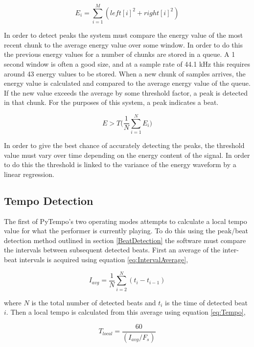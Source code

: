 \documentclass[hidelinks,12pt]{article}
\begin{document}
\begin{equation} \label{eq:EnergySum}
	E_i = \sum_{i=1}^{M}(left[i]^2 + right[i]^2)
\end{equation}

In order to detect peaks the system must compare the energy value of the most recent chunk to the average energy value over some window. In order to do this the previous energy values for a number of chunks are stored in a queue. A 1 second window is often a good size, and at a sample rate of 44.1 kHz this requires around 43 energy values to be stored. When a new chunk of samples arrives, the energy value is calculated and compared to the average energy value of the queue. If the new value exceeds the average by some threshold factor, a peak is detected in that chunk. For the purposes of this system, a peak indicates a beat.

\begin{equation}
	E > T\Bigg(\frac{1}{N}\sum_{i=1}^{N}E_i\Bigg)
\end{equation}

In order to give the best chance of accurately detecting the peaks, the threshold value must vary over time depending on the energy content of the signal. In order to do this the threshold is linked to the variance of the energy waveform by a linear regression.

\subsection{Tempo Detection}
The first of PyTempo's two operating modes attempts to calculate a local tempo value for what the performer is currently playing. To do this using the peak/beat detection method outlined in section  \ref{BeatDetection} the software must compare the intervals between subsequent detected beats. First an average of the inter-beat intervals is acquired using equation \ref{eq:IntervalAverage},

\begin{equation} \label{eq:IntervalAverage}
	I_{avg} = \frac{1}{N}\sum_{i=2}^{N}(t_i - t_{i-1})
\end{equation}

where $N$ is the total number of detected beats and $t_i$ is the time of detected beat $i$. Then a local tempo is calculated from this average using equation \ref{eq:Tempo},

\begin{equation} \label{eq:Tempo}
	T_{local} = \frac{60}{(I_{avg} / F_s)}
\end{equation}
\end{document}
